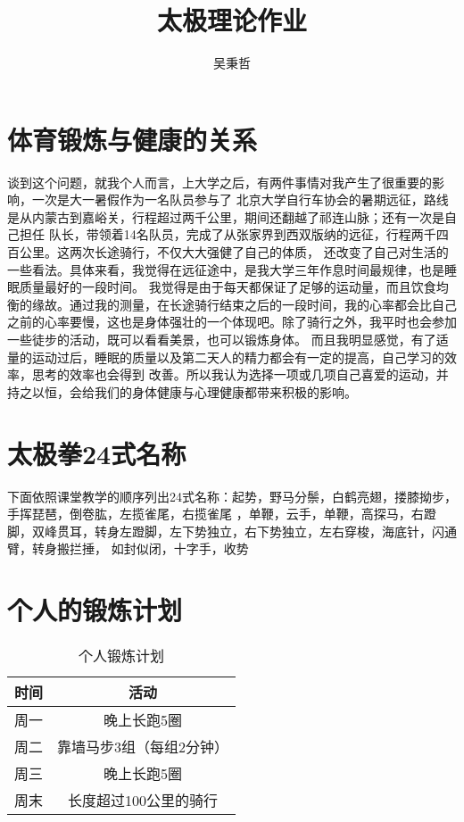 \documentclass[10pt,a4paper]{ctexart}
\author{吴秉哲}
\title{太极理论作业}
\begin{document}
	\maketitle
	\section{体育锻炼与健康的关系}
	谈到这个问题，就我个人而言，上大学之后，有两件事情对我产生了很重要的影响，一次是大一暑假作为一名队员参与了
	北京大学自行车协会的暑期远征，路线是从内蒙古到嘉峪关，行程超过两千公里，期间还翻越了祁连山脉；还有一次是自己担任
	队长，带领着14名队员，完成了从张家界到西双版纳的远征，行程两千四百公里。这两次长途骑行，不仅大大强健了自己的体质，
	还改变了自己对生活的一些看法。具体来看，我觉得在远征途中，是我大学三年作息时间最规律，也是睡眠质量最好的一段时间。
	我觉得是由于每天都保证了足够的运动量，而且饮食均衡的缘故。通过我的测量，在长途骑行结束之后的一段时间，我的心率都会比自己
	之前的心率要慢，这也是身体强壮的一个体现吧。除了骑行之外，我平时也会参加一些徒步的活动，既可以看看美景，也可以锻炼身体。
	而且我明显感觉，有了适量的运动过后，睡眠的质量以及第二天人的精力都会有一定的提高，自己学习的效率，思考的效率也会得到
	改善。所以我认为选择一项或几项自己喜爱的运动，并持之以恒，会给我们的身体健康与心理健康都带来积极的影响。
	\section{太极拳24式名称}
	下面依照课堂教学的顺序列出24式名称：起势，野马分鬃，白鹤亮翅，搂膝拗步，手挥琵琶，倒卷肱，左揽雀尾，右揽雀尾
	，单鞭，云手，单鞭，高探马，右蹬脚，双峰贯耳，转身左蹬脚，左下势独立，右下势独立，左右穿梭，海底针，闪通臂，转身搬拦捶，
	如封似闭，十字手，收势
	\section{个人的锻炼计划}
	\begin{center}
		\begin{longtable}{|c|c|}
			\caption{个人锻炼计划}\\
			\hline
			时间& 活动\\
			\hline
			周一& 晚上长跑5圈\\
			\hline
			周二& 靠墙马步3组（每组2分钟）\\
			\hline
			周三& 晚上长跑5圈\\
			\hline
			周末& 长度超过100公里的骑行\\
			\hline
		\end{longtable}
	\end{center}
\end{document}
